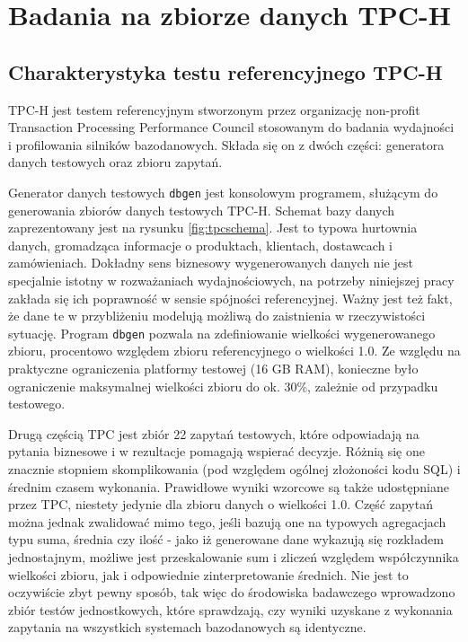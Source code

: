 \documentclass[12pt]{extarticle}
\begin{document}
\section{Badania na zbiorze danych TPC-H} \label{tpc}

\subsection{Charakterystyka testu referencyjnego TPC-H}

    TPC-H jest testem referencyjnym stworzonym przez organizację non-profit Transaction Processing Performance Council stosowanym do badania wydajności i profilowania silników bazodanowych. Składa się on z dwóch części: generatora danych testowych oraz zbioru zapytań.

    Generator danych testowych \texttt{dbgen} jest konsolowym programem, służącym do generowania zbiorów danych testowych TPC-H. Schemat bazy danych zaprezentowany jest na rysunku \ref{fig:tpcschema}. Jest to typowa hurtownia danych, gromadząca informacje o produktach, klientach, dostawcach i zamówieniach. Dokładny sens biznesowy wygenerowanych danych nie jest specjalnie istotny w rozważaniach wydajnościowych, na potrzeby niniejszej pracy zakłada się ich poprawność w sensie spójności referencyjnej. Ważny jest też fakt, że dane te w przybliżeniu modelują możliwą do zaistnienia w rzeczywistości sytuację. Program \texttt{dbgen} pozwala na zdefiniowanie wielkości wygenerowanego zbioru, procentowo względem zbioru referencyjnego o wielkości 1.0. Ze względu na praktyczne ograniczenia platformy testowej (16 GB RAM), konieczne było ograniczenie maksymalnej wielkości zbioru do ok. 30\%, zależnie od przypadku testowego. 

    Drugą częścią TPC jest zbiór 22 zapytań testowych, które odpowiadają na pytania biznesowe i w rezultacje pomagają wspierać decyzje. Różnią się one znacznie stopniem skomplikowania (pod względem ogólnej złożoności kodu SQL) i średnim czasem wykonania. Prawidłowe wyniki wzorcowe są także udostępniane przez TPC, niestety jedynie dla zbioru danych o wielkości 1.0. Część zapytań można jednak zwalidować mimo tego, jeśli bazują one na typowych agregacjach typu suma, średnia czy ilość - jako iż generowane dane wykazują się rozkładem jednostajnym, możliwe jest przeskalowanie sum i zliczeń względem współczynnika wielkości zbioru, jak i odpowiednie zinterpretowanie średnich. Nie jest to oczywiście zbyt pewny sposób, tak więc do środowiska badawczego wprowadzono zbiór testów jednostkowych, które sprawdzają, czy wyniki uzyskane z wykonania zapytania na wszystkich systemach bazodanowych są identyczne.
\end{document}
